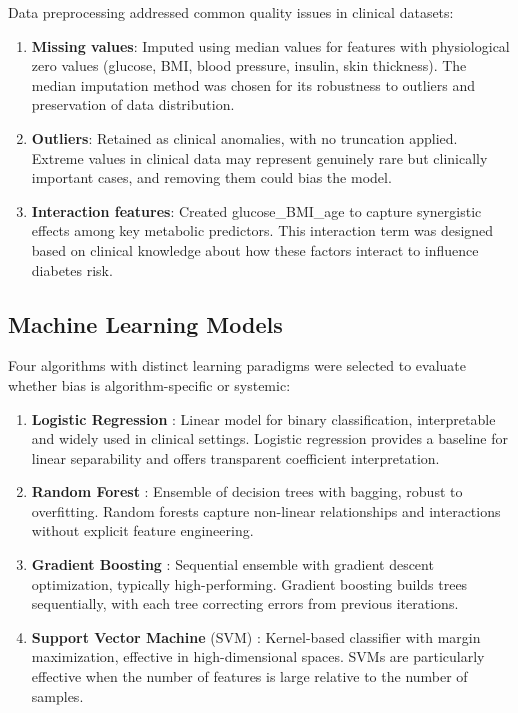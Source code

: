 Data preprocessing addressed common quality issues in clinical datasets:

\begin{enumerate}[leftmargin=*]
    \item \textbf{Missing values}: Imputed using median values for features 
          with physiological zero values (glucose, BMI, blood pressure, 
          insulin, skin thickness). The median imputation method was chosen 
          for its robustness to outliers and preservation of data distribution.
    \item \textbf{Outliers}: Retained as clinical anomalies, with no 
          truncation applied. Extreme values in clinical data may represent 
          genuinely rare but clinically important cases, and removing them 
          could bias the model.
    \item \textbf{Interaction features}: Created glucose\_BMI\_age to 
          capture synergistic effects among key metabolic predictors. This 
          interaction term was designed based on clinical knowledge about 
          how these factors interact to influence diabetes risk.
\end{enumerate}

\subsection{Machine Learning Models}

Four algorithms with distinct learning paradigms were selected to evaluate 
whether bias is algorithm-specific or systemic:

\begin{enumerate}[leftmargin=*]
    \item \textbf{Logistic Regression} \cite{cox1958}: Linear model for 
          binary classification, interpretable and widely used in clinical 
          settings. Logistic regression provides a baseline for linear 
          separability and offers transparent coefficient interpretation.
    \item \textbf{Random Forest} \cite{breiman2001}: Ensemble of decision 
          trees with bagging, robust to overfitting. Random forests capture 
          non-linear relationships and interactions without explicit feature 
          engineering.
    \item \textbf{Gradient Boosting} \cite{friedman2001}: Sequential ensemble 
          with gradient descent optimization, typically high-performing. 
          Gradient boosting builds trees sequentially, with each tree 
          correcting errors from previous iterations.
    \item \textbf{Support Vector Machine} (SVM) \cite{vapnik1995}: 
          Kernel-based classifier with margin maximization, effective in 
          high-dimensional spaces. SVMs are particularly effective when the 
          number of features is large relative to the number of samples.
\end{enumerate}

